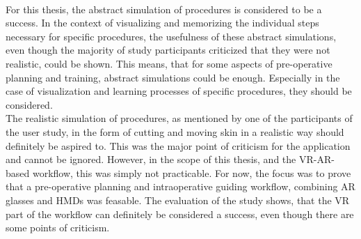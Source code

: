 \\ For this thesis, the abstract simulation of procedures is considered
to be a success. In the context of visualizing and memorizing the individual steps necessary
for specific procedures, the usefulness of these abstract simulations, even
though the majority of study participants criticized that they 
were not realistic, could be shown. This means, that for some 
aspects of pre-operative planning and training, abstract 
simulations could be enough. Especially in the case of visualization and 
learning processes of specific procedures, they should be considered.
\\ The realistic simulation of procedures, as mentioned by one of 
the participants of the user study, in the form of cutting and moving
skin in a realistic way should definitely be aspired to. This 
was the major point of criticism for the application and cannot
be ignored. However, in the scope of this thesis, and the VR-AR-based
workflow, this was simply not practicable. For now, the focus was to
prove that a pre-operative planning and intraoperative guiding workflow, combining
AR glasses and HMDs was feasable. The evaluation of the study shows,
that the VR part of the workflow can definitely be considered a success, 
even though there are some points of criticism.